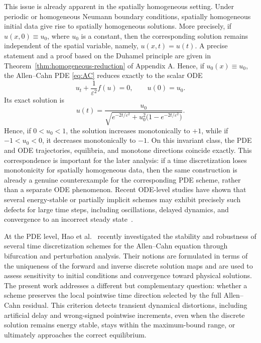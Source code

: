 \documentclass[final, 3p, times]{elsarticle}%
\newcommand{\eps}{\varepsilon}
\begin{document}
This issue is already apparent in the spatially homogeneous setting.
Under periodic or homogeneous Neumann boundary conditions, spatially
homogeneous initial data give rise to spatially homogeneous solutions.
More precisely, if $u(x,0)\equiv u_0$, where $u_0$ is a constant, then
the corresponding solution remains independent of the spatial variable,
namely, $u(x,t)=u(t)$. A precise statement and a proof based on the
Duhamel principle are given in Theorem~\ref{thm:homogeneous-reduction} of
Appendix A. Hence, if
$u_0(x)\equiv u_0$, the Allen--Cahn PDE \eqref{eq:AC} reduces exactly to the scalar ODE
\begin{equation}
    u_t+\frac1{\eps^2}f(u)=0,
    \qquad u(0)=u_0.
    \label{eq:AC-ODE}
\end{equation}
Its exact solution is
\[
    u(t)=\frac{u_0}
    {\sqrt{e^{-2t/\eps^2}+u_0^2\bigl(1-e^{-2t/\eps^2}\bigr)}}.
\]
Hence, if $0<u_0<1$, the solution increases monotonically to $+1$, while if $-1<u_0<0$, it decreases monotonically to $-1$. On this invariant class, the PDE and ODE trajectories, equilibria, and monotone directions coincide exactly. This correspondence is important for the later analysis: if a time discretization loses monotonicity for spatially homogeneous data, then the same construction is already a genuine counterexample for the corresponding PDE scheme, rather than a separate ODE phenomenon. Recent ODE-level studies have shown that several energy-stable or partially implicit schemes may exhibit precisely such defects for large time steps, including oscillations, delayed dynamics, and convergence to an incorrect steady state~\cite{xu2019stability,xu2023lack,li2026asymptotic}.

At the PDE level, Hao et al.~\cite{hao2025stability} recently investigated the stability and robustness of several time discretization schemes for the Allen--Cahn equation through bifurcation and perturbation analysis. Their notions are formulated in terms of the uniqueness of the forward and inverse discrete solution maps and are used to assess sensitivity to initial conditions and convergence toward physical solutions. The present work addresses a different but complementary question: whether a scheme preserves the local pointwise time direction selected by the full Allen--Cahn residual. This criterion detects transient dynamical distortions, including artificial delay and wrong-signed pointwise increments, even when the discrete solution remains energy stable, stays within the maximum-bound range, or ultimately approaches the correct equilibrium.
\end{document}
